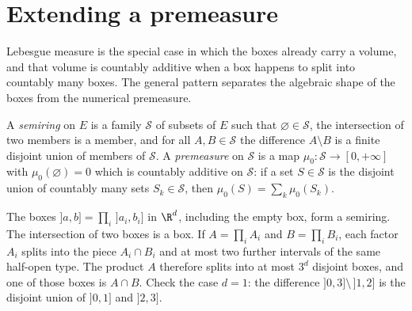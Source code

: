 \section{Extending a premeasure}

Lebesgue measure is the special case in which the boxes already carry a volume, and that volume is countably additive when a box happens to split into countably many boxes.
The general pattern separates the algebraic shape of the boxes from the numerical premeasure.

\begin{definition}
A \emph{semiring} on $E$ is a family $\mathcal S$ of subsets of $E$ such that $\varnothing\in\mathcal S$, the intersection of two members is a member, and for all $A,B\in\mathcal S$ the difference $A\setminus B$ is a finite disjoint union of members of $\mathcal S$.
A \emph{premeasure} on $\mathcal S$ is a map $\mu_0:\mathcal S\to[0,+\infty]$ with $\mu_0(\varnothing)=0$ which is countably additive on $\mathcal S$: if a set $S\in\mathcal S$ is the disjoint union of countably many sets $S_k\in\mathcal S$, then $\mu_0(S)=\sum_k\mu_0(S_k)$.
\end{definition}

The boxes $]a,b]=\prod_i\,]a_i,b_i]$ in $\R^d$, including the empty box, form a semiring.
The intersection of two boxes is a box.
If $A=\prod_i A_i$ and $B=\prod_i B_i$, each factor $A_i$ splits into the piece $A_i\cap B_i$ and at most two further intervals of the same half-open type.
The product $A$ therefore splits into at most $3^d$ disjoint boxes, and one of those boxes is $A\cap B$.
Check the case $d=1$: the difference $]0,3]\setminus\,]1,2]$ is the disjoint union of $]0,1]$ and $]2,3]$.

